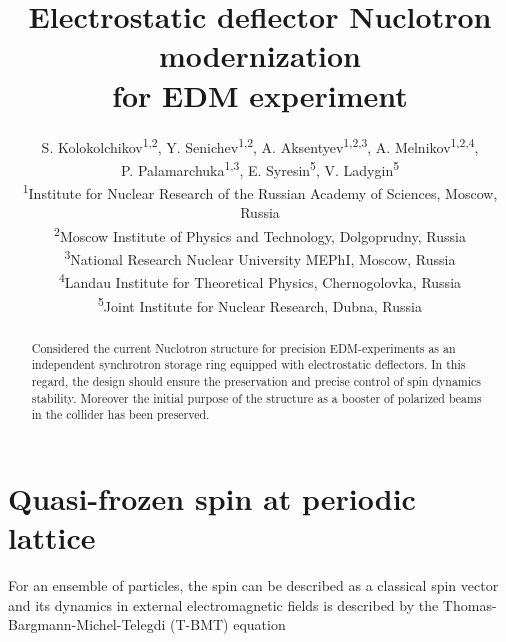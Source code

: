 \documentclass[a4paper,
               keeplastbox,   %
               ]{jacow}
\begin{document}
\title{Electrostatic deflector Nuclotron modernization\\ for EDM experiment}

\author{S. Kolokolchikov\textsuperscript{1,2}, Y. Senichev\textsuperscript{1,2}, A. Aksentyev\textsuperscript{1,2,3}, A. Melnikov\textsuperscript{1,2,4},\\ P. Palamarchuka\textsuperscript{1,3}, E. Syresin\textsuperscript{5}, V. Ladygin\textsuperscript{5} \\
\textsuperscript{1}Institute for Nuclear Research of the Russian Academy of Sciences, Moscow, Russia\\
\textsuperscript{2}Moscow Institute of Physics and Technology, Dolgoprudny, Russia\\
\textsuperscript{3}National Research Nuclear University MEPhI, Moscow, Russia\\
\textsuperscript{4}Landau Institute for Theoretical Physics, Chernogolovka, Russia\\
\textsuperscript{5}Joint Institute for Nuclear Research, Dubna, Russia\\}
	
\maketitle

%
\begin{abstract}

	\par Considered the current Nuclotron structure for precision EDM-experiments as an independent synchrotron storage ring equipped with electrostatic deflectors. In this regard, the design should ensure the preservation and precise control of spin dynamics stability. Moreover the initial purpose of the structure as a booster of polarized beams in the collider has been preserved.

\end{abstract}

\section{Quasi-frozen spin at periodic lattice}\label{sec.II}

\par For an ensemble of particles, the spin can be described as a classical spin vector and its dynamics in external electromagnetic fields is described by the Thomas-Bargmann-Michel-Telegdi (T-BMT) equation \cite{TBMT}
\end{document}
